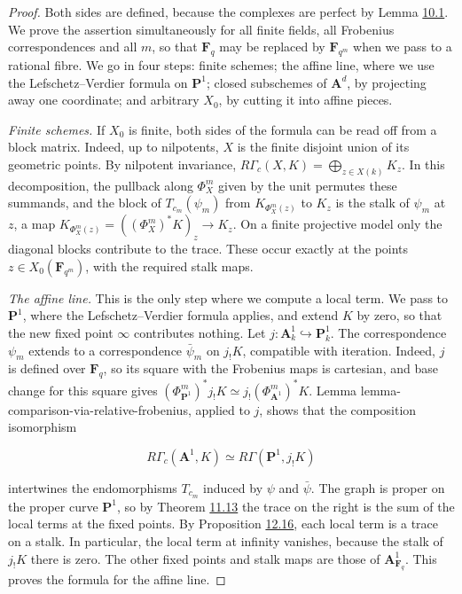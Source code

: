 \documentclass[11pt]{article}
\begin{document}
\begin{proof}[{Proof}]\label{bp288}%
Both sides are defined, because the complexes are perfect by Lemma \hyperref[bp105]{10.1}. We prove the assertion simultaneously for all finite fields, all Frobenius correspondences and all \(m\), so that \(\mathbf F_q\) may be replaced by \(\mathbf F_{q^m}\) when we pass to a rational fibre. We go in four steps: finite schemes; the affine line, where we use the Lefschetz–Verdier formula on \(\mathbf P^1\); closed subschemes of \(\mathbf A^d\), by projecting away one coordinate; and arbitrary \(X_0\), by cutting it into affine pieces.

\emph{Finite schemes.} If \(X_0\) is finite, both sides of the formula can be read off from a block matrix. Indeed, up to nilpotents, \(X\) is the finite disjoint union of its geometric points. By nilpotent invariance, \(R\Gamma_c(X,K)=\bigoplus_{z\in X(k)}K_z\). In this decomposition, the pullback along \(\Phi_X^m\) given by the unit permutes these summands, and the block of \(T_{c_m}(\psi_m)\) from \(K_{\Phi_X^m(z)}\) to \(K_z\) is the stalk of \(\psi_m\) at \(z\), a map \(K_{\Phi_X^m(z)}=((\Phi_X^m)^*K)_z\to K_z\). On a finite projective model only the diagonal blocks contribute to the trace. These occur exactly at the points \(z\in X_0(\mathbf F_{q^m})\), with the required stalk maps.

\emph{The affine line.} This is the only step where we compute a local term. We pass to \(\mathbf P^1\), where the Lefschetz–Verdier formula applies, and extend \(K\) by zero, so that the new fixed point \(\infty\) contributes nothing. Let \(j:\mathbf A^1_k\hookrightarrow\mathbf P^1_k\). The correspondence \(\psi_m\) extends to a correspondence \(\bar\psi_m\) on \(j_!K\), compatible with iteration. Indeed, \(j\) is defined over \(\mathbf F_q\), so its square with the Frobenius maps is cartesian, and base change for this square gives \((\Phi_{\mathbf P^1}^m)^*j_!K\simeq j_!(\Phi_{\mathbf A^1}^m)^*K\). Lemma lemma-comparison-via-relative-frobenius, applied to \(j\), shows that the composition isomorphism

\[
R\Gamma_c(\mathbf A^1,K)
\simeq R\Gamma(\mathbf P^1,j_!K)
\]

intertwines the endomorphisms \(T_{c_m}\) induced by \(\psi\) and \(\bar\psi\). The graph is proper on the proper curve \(\mathbf P^1\), so by Theorem \hyperref[bp206]{11.13} the trace on the right is the sum of the local terms at the fixed points. By Proposition \hyperref[bp274]{12.16}, each local term is a trace on a stalk. In particular, the local term at infinity vanishes, because the stalk of \(j_!K\) there is zero. The other fixed points and stalk maps are those of \(\mathbf A^1_{\mathbf F_q}\). This proves the formula for the affine line.


\end{proof}
\end{document}
